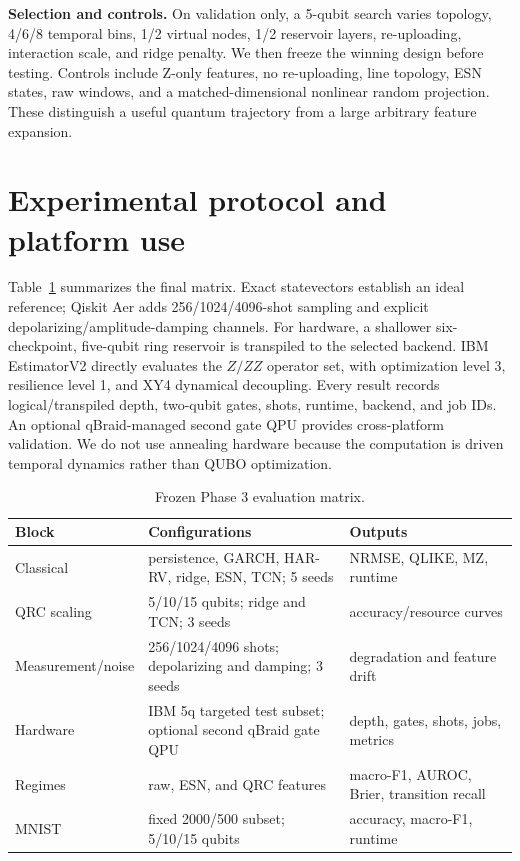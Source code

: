 \documentclass[11pt]{article}
\begin{document}
\textbf{Selection and controls.} On validation only, a 5-qubit search varies topology, 4/6/8 temporal bins, 1/2 virtual nodes, 1/2 reservoir layers, re-uploading, interaction scale, and ridge penalty. We then freeze the winning design before testing. Controls include Z-only features, no re-uploading, line topology, ESN states, raw windows, and a matched-dimensional nonlinear random projection. These distinguish a useful quantum trajectory from a large arbitrary feature expansion.

\section{Experimental protocol and platform use}
Table~\ref{tab:matrix} summarizes the final matrix. Exact statevectors establish an ideal reference; Qiskit Aer adds 256/1024/4096-shot sampling and explicit depolarizing/amplitude-damping channels. For hardware, a shallower six-checkpoint, five-qubit ring reservoir is transpiled to the selected backend. IBM EstimatorV2 directly evaluates the $Z/ZZ$ operator set, with optimization level 3, resilience level 1, and XY4 dynamical decoupling. Every result records logical/transpiled depth, two-qubit gates, shots, runtime, backend, and job IDs. An optional qBraid-managed second gate QPU provides cross-platform validation. We do not use annealing hardware because the computation is driven temporal dynamics rather than QUBO optimization.

\begin{table}[t]
\centering\small
\caption{Frozen Phase 3 evaluation matrix.}
\label{tab:matrix}
\begin{tabularx}{\textwidth}{lXl}
\toprule
Block & Configurations & Outputs\\
\midrule
Classical & persistence, GARCH, HAR-RV, ridge, ESN, TCN; 5 seeds & NRMSE, QLIKE, MZ, runtime\\
QRC scaling & 5/10/15 qubits; ridge and TCN; 3 seeds & accuracy/resource curves\\
Measurement/noise & 256/1024/4096 shots; depolarizing and damping; 3 seeds & degradation and feature drift\\
Hardware & IBM 5q targeted test subset; optional second qBraid gate QPU & depth, gates, shots, jobs, metrics\\
Regimes & raw, ESN, and QRC features & macro-F1, AUROC, Brier, transition recall\\
MNIST & fixed 2000/500 subset; 5/10/15 qubits & accuracy, macro-F1, runtime\\
\bottomrule
\end{tabularx}
\end{table}
\end{document}

